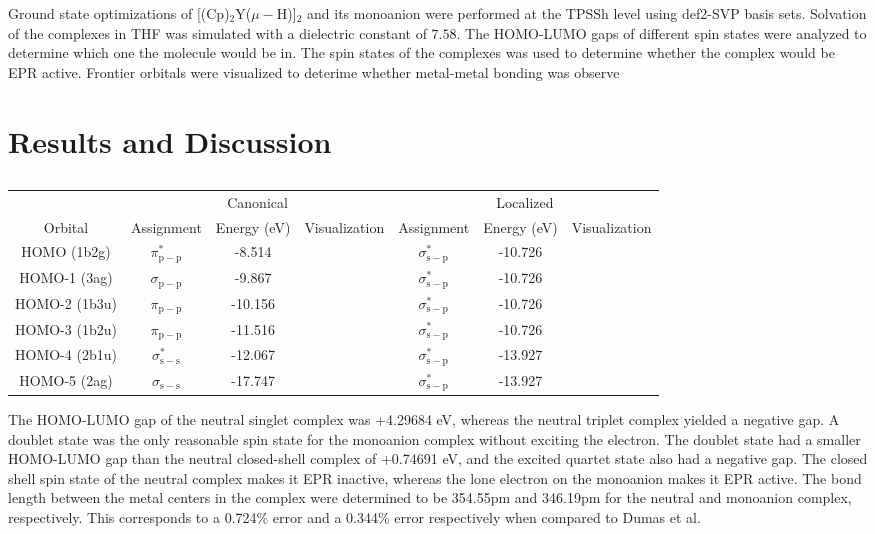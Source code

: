 \documentclass{article}
\begin{document}
Ground state optimizations of [(Cp)$_2$Y($\mu - $H)]$_2$ and its monoanion were
performed at the TPSSh level using def2-SVP basis sets.  Solvation of the
complexes in THF was simulated with a dielectric constant of $7.58$.  The
HOMO-LUMO gaps of different spin states were analyzed to determine which one the
molecule would be in.  The spin states of the complexes was used to determine
whether the complex would be EPR active.  Frontier orbitals were visualized to
deterime whether metal-metal bonding was observe

\section{Results and Discussion} %

\begin{table}[htbp]
    \centering
    \caption{}
    \begin{tabular}{c|ccc|ccc}
	    & \multicolumn{3}{c}{Canonical} & \multicolumn{3}{c}{Localized} \\
	Orbital & Assignment & Energy (eV) & Visualization & Assignment & Energy (eV) & Visualization \\
	    \hline
      HOMO (1b2g)   &  $\pi^*_{\mathrm{p-p}}$     &   -8.514      &
	    &  $\sigma^*_{\mathrm{s-p}}$  &  -10.726  \\
      HOMO-1 (3ag)  &  $\sigma_{\mathrm{p-p}}$    &   -9.867      &
	    &  $\sigma^*_{\mathrm{s-p}}$  &  -10.726  \\
      HOMO-2 (1b3u) &  $\pi_{\mathrm{p-p}}$       &  -10.156      &
	    &  $\sigma^*_{\mathrm{s-p}}$  &  -10.726  \\
      HOMO-3 (1b2u) &  $\pi_{\mathrm{p-p}}$       &  -11.516      &
	    &  $\sigma^*_{\mathrm{s-p}}$  &  -10.726  \\
      HOMO-4 (2b1u) &  $\sigma^*_{\mathrm{s-s}}$  &  -12.067      &
	    &  $\sigma^*_{\mathrm{s-p}}$  &  -13.927  \\
      HOMO-5 (2ag)  &  $\sigma_{\mathrm{s-s}}$    &  -17.747      &
	    &  $\sigma^*_{\mathrm{s-p}}$  &  -13.927  
    \end{tabular}
\end{table}

The HOMO-LUMO gap of the neutral singlet complex was +4.29684 eV, whereas the
neutral triplet complex yielded a negative gap.  A doublet state was the only
reasonable spin state for the monoanion complex without exciting the electron.
The doublet state had a smaller HOMO-LUMO gap than the neutral closed-shell
complex of +0.74691 eV, and the excited quartet state also had a negative gap.
The closed shell spin state of the neutral complex makes it EPR inactive,
whereas the lone electron on the monoanion makes it EPR active.  The bond length
between the metal centers in the complex were determined to be 354.55pm and
346.19pm for the neutral and monoanion complex, respectively.  This corresponds
to a 0.724\% error and a 0.344\% error respectively when compared to Dumas et
al. \cite{dumas}
\end{document}
